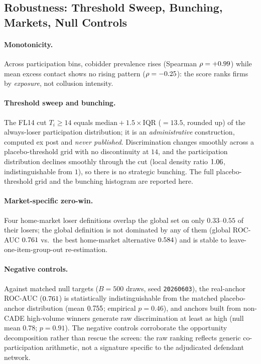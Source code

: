 \subsection{Robustness: Threshold Sweep, Bunching, Markets, Null Controls}
\label{supp:profile_robustness}

\paragraph{Monotonicity.} Across participation bins, cobidder prevalence
rises (Spearman $\rho=+0.99$) while mean excess contact
shows no rising pattern ($\rho=-0.25$): the score ranks
firms by \emph{exposure}, not collusion intensity.

\paragraph{Threshold sweep and bunching.} The FL14 cut $T_i\geq 14$
equals $\mathrm{median}+1.5\times\mathrm{IQR}$ ($=13.5$, rounded up) of
the always-loser participation distribution; it is an
\emph{administrative} construction, computed ex post and \emph{never
published}. Discrimination changes smoothly across a placebo-threshold
grid with no discontinuity at $14$, and the participation distribution
declines smoothly through the cut (local density ratio
$1.06$, indistinguishable from $1$), so there is no
strategic bunching. The full placebo-threshold grid and the bunching
histogram are reported here.

\paragraph{Market-specific zero-win.} Four home-market loser definitions
overlap the global set on only $0.33$--$0.55$ of their losers; the
global definition is not dominated by any of them (global ROC-AUC
$0.761$ vs.\ the best home-market alternative
$0.584$) and is stable to leave-one-item-group-out
re-estimation.

\paragraph{Negative controls.} Against matched null targets ($B=500$
draws, seed \texttt{20260603}), the real-anchor ROC-AUC
($0.761$) is statistically indistinguishable from the
matched placebo-anchor distribution (mean $0.755$;
empirical $p=0.46$), and anchors built from non-CADE high-volume winners
generate raw discrimination at least as high (null mean $0.78$;
$p=0.91$). The negative controls corroborate the opportunity
decomposition rather than rescue the screen: the raw ranking reflects
generic co-participation arithmetic, not a signature specific to the
adjudicated defendant network.
